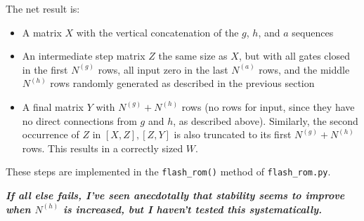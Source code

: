 \documentclass[pdftex,12pt,letterpaper]{article}
\begin{document}
The net result is:
\begin{itemize}
\item A matrix $X$ with the vertical concatenation of the $g$, $h$, and $a$ sequences
\item An intermediate step matrix $Z$ the same size as $X$, but with all gates closed in the first $N^{(g)}$ rows, all input zero in the last $N^{(a)}$ rows, and the middle $N^{(h)}$ rows randomly generated as described in the previous section
\item A final matrix $Y$ with $N^{(g)}+N^{(h)}$ rows (no rows for input, since they have no direct connections from $g$ and $h$, as described above).  Similarly, the second occurrence of $Z$ in $[X,Z],[Z,Y]$ is also truncated to its first $N^{(g)}+N^{(h)}$ rows.  This results in a correctly sized $W$.
\end{itemize}

These steps are implemented in the \texttt{flash\_rom()} method of \texttt{flash\_rom.py}.

\textit{\textbf{If all else fails, I've seen anecdotally that stability seems to improve when $N^{(h)}$ is increased, but I haven't tested this systematically.}}
\end{document}
